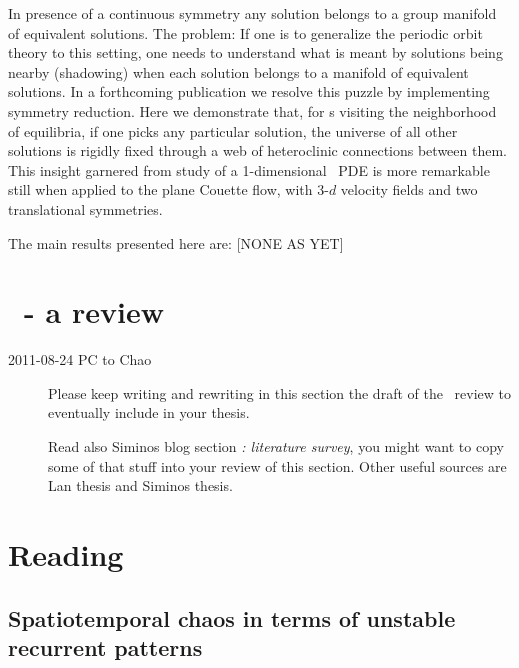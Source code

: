 In presence of a continuous symmetry any solution belongs to a group
manifold of equivalent solutions. The problem: If one is to
generalize the periodic orbit theory to this setting, one needs to
understand what is meant by solutions being nearby (shadowing) when
each solution belongs to a manifold of equivalent solutions. {In a
forthcoming publication we resolve this puzzle by implementing
symmetry reduction.} Here we demonstrate that, {for \rpo s visiting the
neighborhood of equilibria,} if one picks any
particular solution, the universe of all other solutions is rigidly
fixed through a web of heteroclinic connections between them. This
insight garnered from study of a 1-dimensional \KS\ PDE is more
remarkable still when applied to the plane Couette flow,
with 3-$d$ velocity fields and two translational symmetries.

The main results presented here are: [NONE AS YET]

\section{\KSe\ - a review}
\label{chap:KSreview}

\begin{description}

\item[2011-08-24 PC to Chao]
Please keep writing and rewriting in this section the draft of the
\KSe\ review to eventually include in your thesis.

Read also Siminos blog section \emph{ \KS: literature survey}, you might
want to copy some of that stuff into your review of this section. Other
useful sources are Lan thesis and Siminos
thesis.

\end{description}



\section{Reading}
\label{s:KSreading}

\subsection{Spatiotemporal chaos in terms of unstable recurrent patterns}
\label{s:Christiansen97}

